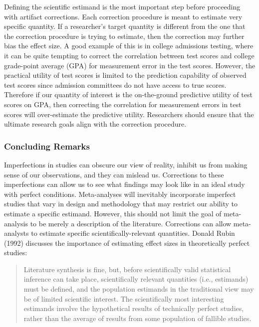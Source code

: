 \documentclass[
  letterpaper,
  DIV=11,
  numbers=noendperiod]{scrreprt}
\begin{document}
Defining the scientific estimand is the most important step before
proceeding with artifact corrections. Each correction procedure is meant
to estimate very specific quantity. If a researcher's target quantity is
different from the one that the correction procedure is trying to
estimate, then the correction may further bias the effect size. A good
example of this is in college admissions testing, where it can be quite
tempting to correct the correlation between test scores and college
grade-point average (GPA) for measurement error in the test scores.
However, the practical utility of test scores is limited to the
prediction capability of observed test scores since admission committees
do not have access to true scores. Therefore if our quantity of interest
is the on-the-ground predictive utility of test scores on GPA, then
correcting the correlation for measurement errors in test scores will
over-estimate the predictive utility. Researchers should ensure that the
ultimate research goals align with the correction procedure.

\hypertarget{concluding-remarks}{%
\subsubsection*{Concluding Remarks}\label{concluding-remarks}}

Imperfections in studies can obscure our view of reality, inhibit us
from making sense of our observations, and they can mislead us.
Corrections to these imperfections can allow us to see what findings may
look like in an ideal study with perfect conditions. Meta-analyses will
inevitably incorporate imperfect studies that vary in design and
methodology that may restrict our ability to estimate a specific
estimand. However, this should not limit the goal of meta-analysis to be
merely a description of the literature. Corrections can allow
meta-analysts to estimate specific scientifically-relevant quantities.
Donald Rubin (1992) discusses the importance of estimating effect sizes
in theoretically perfect studies:

\begin{quote}
Literature synthesis is fine, but, before scientifically valid
statistical inference can take place, scientifically relevant quantities
(i.e., estimands) must be defined, and the population estimands in the
traditional view may be of limited scientific interest. The
scientifically most interesting estimands involve the hypothetical
results of technically perfect studies, rather than the average of
results from some population of fallible studies.
\end{quote}
\end{document}
